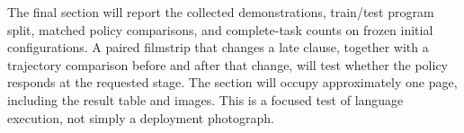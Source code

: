 The final section will report the collected demonstrations, train/test program split, matched policy comparisons, and complete-task counts on frozen initial configurations. A paired filmstrip that changes a late clause, together with a trajectory comparison before and after that change, will test whether the policy responds at the requested stage. The section will occupy approximately one page, including the result table and images. This is a focused test of language execution, not simply a deployment photograph.
